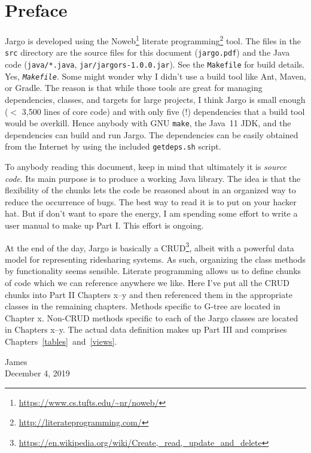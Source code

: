 \chapter*{Preface}
\label{preface}


Jargo is developed using the
Noweb\footnote{\url{https://www.cs.tufts.edu/~nr/noweb/}} literate
programming\footnote{\url{http://literateprogramming.com/}} tool.  The files in
the {\tt{}src} directory are the source files for this document ({\tt{}jargo.pdf})
and the Java code ({\tt{}java/*.java}, {\tt{}jar/jargors-1.0.0.jar}).  See the
\texttt{Makefile} for build details. Yes, \textit{\texttt{Makefile}}. Some
might wonder why I didn't use a build tool like Ant, Maven, or Gradle. The
reason is that while those tools are great for managing dependencies, classes,
and targets for large projects, I think Jargo is small enough ($<$ 3,500 lines
of core code) and with only five (!) dependencies that a build tool would be
overkill. Hence anybody with GNU \texttt{make}, the Java~11 JDK, and the
dependencies can build and run Jargo. The dependencies can be easily obtained
from the Internet by using the included \texttt{getdeps.sh} script.

To anybody reading this document, keep in mind that ultimately it is
\emph{source code}. Its main purpose is to produce a working Java library. The
idea is that the flexibility of the chunks lets the code be reasoned about in
an organized way to reduce the occurrence of bugs. The best way to read it is
to put on your hacker hat. But if don't want to spare the energy, I
am spending some effort to write a user manual to make up Part I. This effort
is ongoing.

At the end of the day, Jargo is basically a
CRUD\footnote{\url{https://en.wikipedia.org/wiki/Create,_read,_update_and_delete}},
albeit with a powerful data model for representing ridesharing systems. As
such, organizing the class methods by functionality seems sensible.  Literate
programming allows us to define chunks of code which we can reference anywhere
we like. Here I've put all the CRUD chunks into Part II Chapters x--y and then
referenced them in the appropriate classes in the remaining chapters. Methods
specific to G-tree are located in Chapter x.  Non-CRUD methods specific to each
of the Jargo classes are located in Chapters x--y. The actual data definition
makes up Part III and comprises Chapters~\ref{tables}~and~\ref{views}.

\bigskip
\begin{flushright}
James\\
December 4, 2019
\end{flushright}

